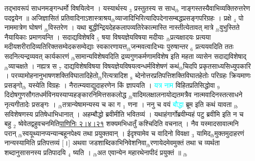 \documentclass[article,12pt,a4paper]{memoir}%
\newcommand{\quotelemma}[1]{\textcolor{cyan}{#1}}
\begin{document}
	  
	  \pstart \leavevmode%
	तद्भावरूपं साधनमङ्गन्धर्मो विषयित्वेन । यस्यार्थस्य {\tiny $_{3}$} प्रस्तुतस्य स साध{\tiny $_{lb}$} \leavevmode{} नाङ्गस्तस्यैवाभिव्यक्तिरुत्तरेण पदद्वयेन ॥ अजिज्ञासितं प्रतिवादिनाऽशास्त्राश्रय{\tiny $_{lb}$}व्याजादिभिरित्यादिपदेनासम्बद्धप्रसङ्गपरिग्रहः । प्रक्षे {\tiny $_{4}$} पो नाममात्रेण घोषणं {\tiny $_{lb}$}विस्तरेण । यथा बुद्धीन्द्रियदेहकलापव्यतिरेकात्मास्ति नास्तीत्येतावत् मात्रे {\tiny $_{lb}$}वुभुस्तिते नैयायिकाः प्रमाणयन्ति । सदाद्यविशेषवि {\tiny $_{5}$} षया विषयज्ञेयविषया मदीयाः {\tiny $_{lb}$}प्रत्यक्षादयः प्रत्यया मदीयशरीरादिव्यतिरिक्तसम्वेदकसम्वेद्याः स्वकारणायत्त{\tiny $_{lb}$}जन्मवत्वादिभ्यः पुरुषान्तर {\tiny $_{6}$} प्रत्ययवदिति ततः सदनित्यन्द्रव्यवत् कार्यकारणं {\tiny $_{lb}$}सामान्यविशेषवदिति द्रव्यगुणकर्मणामविशेष इति महता व्यासेन सदाद्यविशेषाद् {\tiny $_{lb}$}व्याचक्षते । नह्यत्र स {\tiny $_{7}$} दाद्यविशेषविषया विषयज्ञेयविषयत्वन्धर्मविशेषणं कथं{\tiny $_{lb}$}चिदपि प्रकृतसाध्यसिध्युपकारि । परव्यामोहनानुभाषणशक्तिविघातादिहेतो{\tiny $_{lb}$}रित्यत्रादिश {\tiny $_{8}$} ब्देनोत्तरप्रतिपत्तिशक्तिविघातहेतोः परिग्रहः क्रियमाणः प्रसङ्गो{\tiny $_{lb}$} \leavevmode{} यस्येति विग्रहः । नैरात्म्यवाद्युदाहरणेन किं ज्ञापयति । \quotelemma{यत्र नाम} विहितप्रतिसिद्धोवा {\tiny $_{9}$} \leavevmode{} दिदोषगुणसौगतधर्मविनयस्याप्यहङ्कारनिमित्तसकलोद्ध {\tiny $_{lb}$}वादिमलक्षालनायोद्यतमत्रैव नात्मवादिनस्तत्साधने नृत्यगीतादेः प्रसङ्गः । {\tiny $_{lb}$}तत्रान्येषामन्यस्य च का ग {\tiny $_{1}$} णना । ननु च वयं \quotelemma{बौद्धा} ब्रूम इति कथं यावता {\tiny $_{lb}$}सविशेषणस्य प्रतिषेधाभिधानात् । अहम्बौद्धो ब्रवीमीति भवितव्यं । यथाहंगार्गोब्रवीम्यहं पटु ब्रवीमि इति न च बहु {\tiny $_{2}$} ष्वेवेतद्वहुवचनमिति\href{http://sarit.indology.info/?cref=P\%C4\%81.2.4.21}{पाणिनिः  २।४।२१} शक्यमभिधातुँ कश्चिदिति वचनात् । नैव यस्मादसावात्मनि परान् {\tiny $_{lb}$}स्वयूथ्यानप्यन्यान्बहूनपेक्ष्य तथा प्रयुक्तवान् । ईदृश्यामेव च वादिनो विवक्षा {\tiny $_{3}$} यामिद{\tiny $_{lb}$}मुक्तमुदाहरणं नान्यस्यामिति प्रतिपत्तव्यं [।] अथवा जडशाब्दिकाभिनिवेशनिवा{\tiny $_{lb}$}रणायेदमेवमुक्तं तथा च व्यर्थता शब्दानुसासनस्य प्रतिपादयि {\tiny $_{4}$} ष्यति । {\tiny $_{lb}$}अत एवान्येन महारथेनापीदं प्रयुक्तं ॥ {\tiny $_{lb}$} 
	    \pend%
	  
\end{document}
